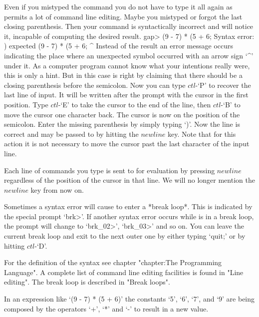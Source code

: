 Even if you mistyped the command you do not have to  type it all again as
{\GAP}  permits a lot of  command  line editing.   Maybe you mistyped  or
forgot the last closing parenthesis.  Then  your command is syntactically
incorrect and  {\GAP} will  notice it, incapable of computing the desired
result.
\beginexample
    gap> (9 - 7) * (5 + 6;
    Syntax error: ) expected
    (9 - 7) * (5 + 6;
                    ^
\endexample
Instead of the result an error message occurs  indicating the place where
an unexpected  symbol  occurred with  an arrow sign `^' under  it.  As a
computer program cannot know  what  your  intentions really were, this is
only a hint.  But  in this  case {\GAP} is right  by  claiming that there
should be a closing  parenthesis before the semicolon.  Now  you can type
$ctl$-`P' to  recover the last line of  input.  It  will be written after
the prompt with the cursor in the first position.  Type $ctl$-`E' to take
the cursor  to the end of the line, then $ctl$-`B' to move the cursor one
character  back.  The  cursor  is  now  on the position of the semicolon.
Enter  the missing  parenthesis  by simply typing `)'.  Now  the  line is
correct and may be passed to {\GAP} by  hitting  the $newline$ key.  Note
that for this action it is not necessary to move the cursor past the last
character of the input line.

Each  line  of commands you  type  is  sent to  {\GAP} for  evaluation by
pressing $newline$ regardless of the position of the cursor in that line.
We will no longer mention the $newline$ key from now on.

Sometimes a syntax error will cause {\GAP} to enter a *break loop*.  This
is indicated by the special prompt `brk>'. If another syntax error occurs
while  {\GAP} is in  a break loop, the prompt  will  change to `brk_02>',
`brk_03>' and so on. You can leave the current break loop and exit to the
next outer one by either typing `quit;' or by hitting $ctl$-`D'.

For the  definition  of the    {\GAP}  syntax see  chapter   "chapter:The
Programming Language". A complete list of command line editing facilities
is found in "Line editing". The break loop is described in "Break loops".

\null

%
In an  expression like `(9  - 7) * (5 +  6)' the constants `5', `6', `7',
and `9' are being composed by the operators `+', `*' and `-' to result in
a new value.

